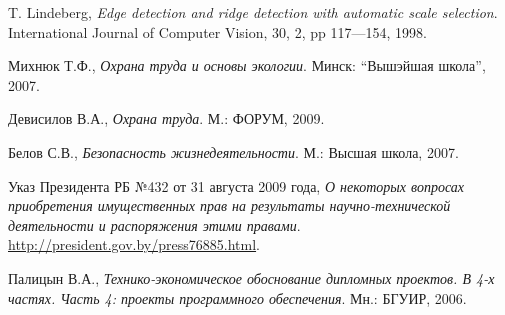 \begin{thebibliography}{99}
  T. Lindeberg,
  \emph{Edge detection and ridge detection with automatic scale selection}.
  International Journal of Computer Vision, 30, 2, pp 117—154,
  1998.

  Михнюк Т.Ф.,
  \emph{Охрана труда и основы экологии}.
  Минск: ``Вышэйшая школа'',
  2007.

  Девисилов В.А.,
  \emph{Охрана труда}.
  М.: ФОРУМ,
  2009.

  Белов С.В.,
  \emph{Безопасность жизнедеятельности}.
  М.: Высшая школа,
  2007.

  Указ Президента РБ №432 от 31 августа 2009 года,
  \emph{О некоторых вопросах приобретения имущественных прав на результаты научно-технической деятельности и распоряжения этими правами}.
  \href{http://president.gov.by/press76885.html}{http://president.gov.by/press76885.html}.

  Палицын В.А.,
  \emph{Технико-экономическое обоснование дипломных проектов. В 4-х частях. Часть 4: проекты программного обеспечения}.
  Мн.: БГУИР,
  2006.

\end{thebibliography}
